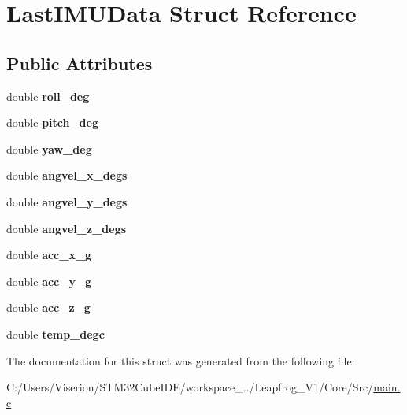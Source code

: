 \hypertarget{struct_last_i_m_u_data}{}\section{Last\+I\+M\+U\+Data Struct Reference}
\label{struct_last_i_m_u_data}
\subsection*{Public Attributes}
\begin{DoxyCompactItemize}
\item 
\mbox{\label{struct_last_i_m_u_data_a9f4f72af69187e2fdeb84c93c6cb51c5}} 
double {\bfseries roll\+\_\+deg}
\item 
\mbox{\label{struct_last_i_m_u_data_a66d9d6bc12906c73d99a2d38b7cfc9f9}} 
double {\bfseries pitch\+\_\+deg}
\item 
\mbox{\label{struct_last_i_m_u_data_af4ea682d62278bdb2ddb52ad11c63d15}} 
double {\bfseries yaw\+\_\+deg}
\item 
\mbox{\label{struct_last_i_m_u_data_a079bdc6aae9f793d4c8c1591c25e764e}} 
double {\bfseries angvel\+\_\+x\+\_\+degs}
\item 
\mbox{\label{struct_last_i_m_u_data_aee5294aa90a9a249885df3483fb443d1}} 
double {\bfseries angvel\+\_\+y\+\_\+degs}
\item 
\mbox{\label{struct_last_i_m_u_data_a0a90b19dad8f664e48e5f8396d7d02c9}} 
double {\bfseries angvel\+\_\+z\+\_\+degs}
\item 
\mbox{\label{struct_last_i_m_u_data_ab2f529becd3f029591d6efe635458bd0}} 
double {\bfseries acc\+\_\+x\+\_\+g}
\item 
\mbox{\label{struct_last_i_m_u_data_aaa797a34843ba0ffbcd31eeab01be56f}} 
double {\bfseries acc\+\_\+y\+\_\+g}
\item 
\mbox{\label{struct_last_i_m_u_data_aa45e6de9519982bd54de32dc4b9ab563}} 
double {\bfseries acc\+\_\+z\+\_\+g}
\item 
\mbox{\label{struct_last_i_m_u_data_a61599448095cf3644285f6724fa6c172}} 
double {\bfseries temp\+\_\+degc}
\end{DoxyCompactItemize}


The documentation for this struct was generated from the following file\+:\begin{DoxyCompactItemize}
\item 
C\+:/\+Users/\+Viserion/\+S\+T\+M32\+Cube\+I\+D\+E/workspace\+\_../\+Leapfrog\+\_\+\+V1/\+Core/\+Src/\mbox{\hyperlink{main_8c}{main.\+c}}\end{DoxyCompactItemize}
